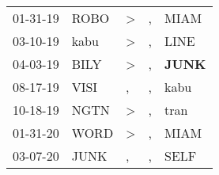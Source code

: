 \begin{supertabular}{p{0.07\textwidth}p{0.06\textwidth}p{0.02\textwidth}p{0.02\textwidth}p{0.06\textwidth}}
          01-31-19\textsuperscript{} &           ROBO\textsuperscript{} &     \textgreater &                , &           MIAM\textsuperscript{} \\
          03-10-19\textsuperscript{} &           kabu\textsuperscript{} &     \textgreater &                , &           LINE\textsuperscript{} \\
          04-03-19\textsuperscript{} &           BILY\textsuperscript{} &     \textgreater &                , &  \textbf{JUNK\textsuperscript{}} \\
          08-17-19\textsuperscript{} &           VISI\textsuperscript{} &                , &                , &           kabu\textsuperscript{} \\
          10-18-19\textsuperscript{} &           NGTN\textsuperscript{} &     \textgreater &                , &           tran\textsuperscript{} \\
          01-31-20\textsuperscript{} &           WORD\textsuperscript{} &     \textgreater &                , &           MIAM\textsuperscript{} \\
          03-07-20\textsuperscript{} &           JUNK\textsuperscript{} &                , &                , &           SELF\textsuperscript{} \\
\end{supertabular}
